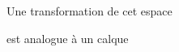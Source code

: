 \documentclass[preview]{standalone}
\begin{document}
\begin{center}
Une transformation de cet espace
        
est analogue à un calque
\end{center}
\end{document}
